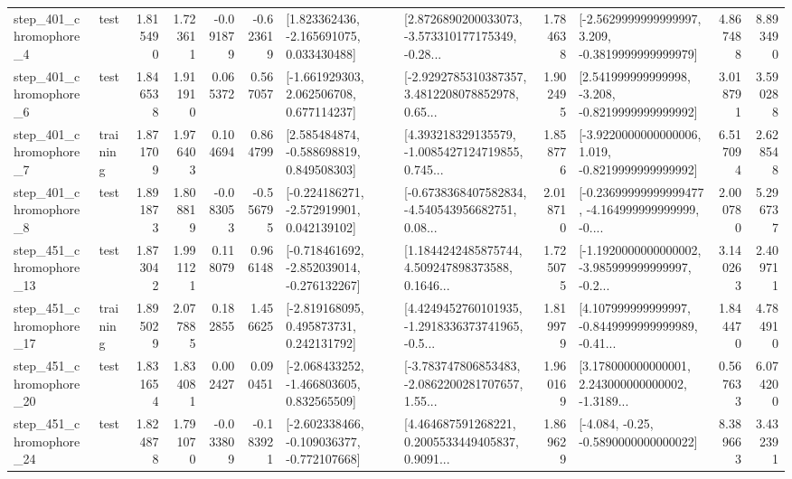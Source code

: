 \begin{tabular}{llrrrrllrlrr}
   step\_401\_chromophore\_4 &      test &      1.815490 &    1.723611 &     -0.091879 & -0.623619 &    [1.823362436, -2.165691075, 0.033430488] &  [2.8726890200033073, -3.573310177175349, -0.28... &       1.784638 &  [-2.5629999999999997, 3.209, -0.3819999999999979] &            4.867488 &          8.893490 \\
   step\_401\_chromophore\_6 &      test &      1.846538 &    1.911910 &      0.065372 &  0.567057 &    [-1.661929303, 2.062506708, 0.677114237] &  [-2.9292785310387357, 3.4812208078852978, 0.65... &       1.902495 &   [2.541999999999998, -3.208, -0.8219999999999992] &            3.018791 &          3.590288 \\
   step\_401\_chromophore\_7 &  training &      1.871709 &    1.976403 &      0.104694 &  0.864799 &    [2.585484874, -0.588698819, 0.849508303] &  [4.393218329135579, -1.0085427124719855, 0.745... &       1.858776 &  [-3.9220000000000006, 1.019, -0.8219999999999992] &            6.517094 &          2.628548 \\
   step\_401\_chromophore\_8 &      test &      1.891873 &    1.808819 &     -0.083053 & -0.556795 &   [-0.224186271, -2.572919901, 0.042139102] &  [-0.6738368407582834, -4.540543956682751, 0.08... &       2.018710 &  [-0.23699999999999477, -4.164999999999999, -0.... &            2.000780 &          5.296737 \\
  step\_451\_chromophore\_13 &      test &      1.873042 &    1.991121 &      0.118079 &  0.966148 &  [-0.718461692, -2.852039014, -0.276132267] &  [1.1844242485875744, 4.509247898373588, 0.1646... &       1.725075 &  [-1.1920000000000002, -3.985999999999997, -0.2... &            3.140263 &          2.409711 \\
  step\_451\_chromophore\_17 &  training &      1.895029 &    2.077885 &      0.182855 &  1.456625 &    [-2.819168095, 0.495873731, 0.242131792] &  [4.4249452760101935, -1.2918336373741965, -0.5... &       1.819979 &  [4.107999999999997, -0.8449999999999989, -0.41... &            1.844470 &          4.784910 \\
  step\_451\_chromophore\_20 &      test &      1.831654 &    1.834081 &      0.002427 &  0.090451 &   [-2.068433252, -1.466803605, 0.832565509] &  [-3.783747806853483, -2.0862200281707657, 1.55... &       1.960169 &  [3.178000000000001, 2.243000000000002, -1.3189... &            0.567633 &          6.074200 \\
  step\_451\_chromophore\_24 &      test &      1.824878 &    1.791070 &     -0.033809 & -0.183921 &  [-2.602338466, -0.109036377, -0.772107668] &  [4.464687591268221, 0.2005533449405837, 0.9091... &       1.869629 &               [-4.084, -0.25, -0.5890000000000022] &            8.389663 &          3.432391 \\

\end{tabular}
